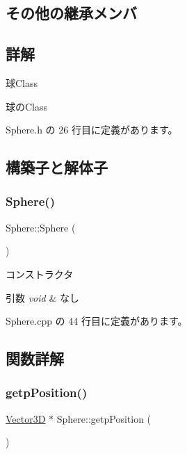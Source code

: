 \subsection*{その他の継承メンバ}


\subsection{詳解}
球\+Class 

球の\+Class 

 Sphere.\+h の 26 行目に定義があります。



\subsection{構築子と解体子}
\mbox{\label{class_sphere_a890a63ff583cb88e7ec4e840b4ef5eb9}} 
\subsubsection{\texorpdfstring{Sphere()}{Sphere()}}
{\footnotesize\ttfamily Sphere\+::\+Sphere (\begin{DoxyParamCaption}{ }\end{DoxyParamCaption})}



コンストラクタ 


\begin{DoxyParams}{引数}
{\em void} & なし \\
\hline
\end{DoxyParams}


 Sphere.\+cpp の 44 行目に定義があります。



\subsection{関数詳解}
\mbox{\label{class_sphere_ad1885bd0628ecd509ea2a61918875bd1}} 
\subsubsection{\texorpdfstring{getp\+Position()}{getpPosition()}}
{\footnotesize\ttfamily \mbox{\hyperlink{class_vector3_d}{Vector3D}} $\ast$ Sphere\+::getp\+Position (\begin{DoxyParamCaption}{ }\end{DoxyParamCaption})}



